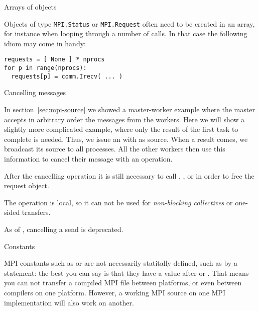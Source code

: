  {Arrays of objects}

Objects of type \lstinline{MPI.Status} or \lstinline{MPI.Request} often need to be created
in an array, for instance when looping through a number of  calls.
In that case the following idiom may come in handy:

\lstset{language=Python} %
\begin{lstlisting}
requests = [ None ] * nprocs
for p in range(nprocs):
  requests[p] = comm.Irecv( ... )
\end{lstlisting}
\lstset{language=C} %


 {Cancelling messages}

In section~\ref{sec:mpi-source} we showed a master-worker example where the 
master accepts in arbitrary order the messages from the workers.
Here we will show a slightly
more complicated example, where only the result of the first task to
complete is needed. Thus, we issue an 
with  as source.  When a result comes, we
broadcast its source to all processes.  All the other workers then use
this information to cancel their message with
an  operation.
%

After the cancelling operation it is still necessary to call
, , or
 in order to free the request object.

The  operation is local, so it can not be
used for \emph{non-blocking
  collectives} or one-sided transfers.

\begin{remark}
  As of , cancelling a send is deprecated.
\end{remark}

 {Constants}

MPI constants such as  or  are not
necessarily statitally defined, such as by a  statement:
the best you can say is that they have a value after
 or .
That means you can not transfer a compiled MPI file between
platforms, or even between compilers on one platform.
However, a working MPI source on one MPI implementation
will also work on another.

